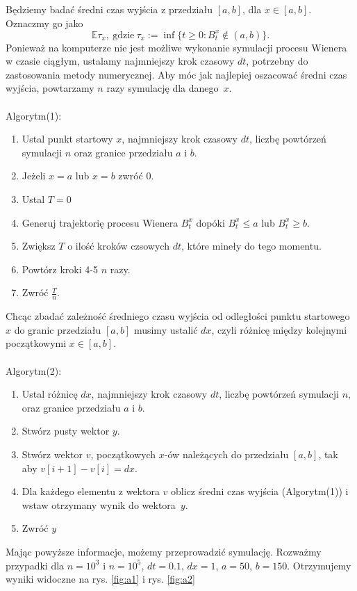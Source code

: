 \documentclass{article}
\theoremstyle{break}
\numberwithin{equation}{subsection}
\numberwithin{figure}{section}
\begin{document}
Będziemy badać średni czas wyjścia z  przedziału $[a,b]$, dla $x\in[a,b]$. Oznaczmy go jako $$\mathbb{E}\tau_x \mathrm{,~gdzie~}\tau_x:=\inf\{t\geq0:B_t^x\notin(a,b)\}.$$ 
Ponieważ na komputerze nie jest możliwe wykonanie symulacji procesu Wienera w czasie ciągłym, ustalamy najmniejszy krok czasowy $dt$, potrzebny do zastosowania metody numerycznej. Aby móc jak najlepiej oszacować średni czas wyjścia, powtarzamy $n$ razy symulację dla danego~$x$.\\ \\
Algorytm(1):
\begin{enumerate}
	\item Ustal punkt startowy $x$, najmniejszy krok czasowy $dt$, liczbę powtórzeń symulacji $n$ oraz granice przedziału $a$ i $b$.
	\item Jeżeli $x=a$ lub $x=b$ zwróć 0.
	\item Ustal $T=0$ 
	\item Generuj trajektorię procesu Wienera $B_t^x$ dopóki $B_t^x\leq a$ lub $B_t^x\geq b$.
	\item Zwiększ $T$ o ilość kroków czsowych $dt$, które mineły do tego momentu.
	\item Powtórz kroki 4-5 $n$ razy.
	\item Zwróć $\frac{T}{n}$.
\end{enumerate}
Chcąc zbadać zależność średniego czasu wyjścia od odległości punktu startowego $x$ do granic przedziału $[a,b]$ musimy ustalić $dx$, czyli różnicę między kolejnymi początkowymi $x \in [a,b]$.\\ \\ 
Algorytm(2):
\begin{enumerate}
	\item Ustal różnicę $dx$, najmniejszy krok czasowy $dt$, liczbę powtórzeń symulacji $n$, oraz granice przedziału $a$ i $b$.
	\item Stwórz pusty wektor $y$.
	\item Stwórz wektor $v$, początkowych $x$-ów należących do przedziału $[a,b]$, tak aby $v[i+1]-v[i]=dx$.
	\item Dla każdego elementu z wektora $v$ oblicz średni czas wyjścia (Algorytm(1)) i wstaw otrzymany wynik do wektora~$y$.
	\item Zwróć $y$
\end{enumerate}
Mając powyższe informacje, możemy przeprowadzić symulację. Rozważmy przypadki dla $n=10^3$ i $n=10^5$, $dt=0.1$, $dx=1$, $a=50$, $b=150$. Otrzymujemy wyniki widoczne na rys. \ref{fig:a1} i rys. \ref{fig:a2}
\end{document}
